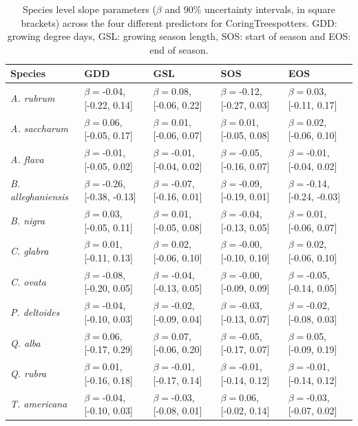 \documentclass{article}\usepackage[]{graphicx}\usepackage[]{xcolor}
\begin{document}
\begin{table}[ht]
\centering
\begin{tabular}{lllll}
  \hline
Species & GDD & GSL & SOS & EOS \\ 
  \hline
\textit{\textit{A. rubrum}} & $\beta = $-0.04, [-0.22, 0.14] & $\beta = $0.08, [-0.06, 0.22] & $\beta = $-0.12, [-0.27, 0.03] & $\beta = $0.03, [-0.11, 0.17] \\ 
  \textit{\textit{A. saccharum}} & $\beta = $0.06, [-0.05, 0.17] & $\beta = $0.01, [-0.06, 0.07] & $\beta = $0.01, [-0.05, 0.08] & $\beta = $0.02, [-0.06, 0.10] \\ 
  \textit{\textit{A. flava}} & $\beta = $-0.01, [-0.05, 0.02] & $\beta = $-0.01, [-0.04, 0.02] & $\beta = $-0.05, [-0.16, 0.07] & $\beta = $-0.01, [-0.04, 0.02] \\ 
  \textit{\textit{B. alleghaniensis}} & $\beta = $-0.26, [-0.38, -0.13] & $\beta = $-0.07, [-0.16, 0.01] & $\beta = $-0.09, [-0.19, 0.01] & $\beta = $-0.14, [-0.24, -0.03] \\ 
  \textit{\textit{B. nigra}} & $\beta = $0.03, [-0.05, 0.11] & $\beta = $0.01, [-0.05, 0.08] & $\beta = $-0.04, [-0.13, 0.05] & $\beta = $0.01, [-0.06, 0.07] \\ 
  \textit{\textit{C. glabra}} & $\beta = $0.01, [-0.11, 0.13] & $\beta = $0.02, [-0.06, 0.10] & $\beta = $-0.00, [-0.10, 0.10] & $\beta = $0.02, [-0.06, 0.10] \\ 
  \textit{\textit{C. ovata}} & $\beta = $-0.08, [-0.20, 0.05] & $\beta = $-0.04, [-0.13, 0.05] & $\beta = $-0.00, [-0.09, 0.09] & $\beta = $-0.05, [-0.14, 0.05] \\ 
  \textit{\textit{P. deltoides}} & $\beta = $-0.04, [-0.10, 0.03] & $\beta = $-0.02, [-0.09, 0.04] & $\beta = $-0.03, [-0.13, 0.07] & $\beta = $-0.02, [-0.08, 0.03] \\ 
  \textit{\textit{Q. alba}} & $\beta = $0.06, [-0.17, 0.29] & $\beta = $0.07, [-0.06, 0.20] & $\beta = $-0.05, [-0.17, 0.07] & $\beta = $0.05, [-0.09, 0.19] \\ 
  \textit{\textit{Q. rubra}} & $\beta = $0.01, [-0.16, 0.18] & $\beta = $-0.01, [-0.17, 0.14] & $\beta = $-0.01, [-0.14, 0.12] & $\beta = $-0.01, [-0.14, 0.12] \\ 
  \textit{\textit{T. americana}} & $\beta = $-0.04, [-0.10, 0.03] & $\beta = $-0.03, [-0.08, 0.01] & $\beta = $0.06, [-0.02, 0.14] & $\beta = $-0.03, [-0.07, 0.02] \\ 
   \hline
\end{tabular}
\caption{Species level slope parameters ($\beta$ and 90\% uncertainty intervals, in square brackets) across the four different predictors for CoringTreespotters. GDD: growing degree days, GSL: growing season length, SOS: start of season and EOS: end of season.} 
\label{tab:ts_slope_table}
\end{table}
\end{document}
